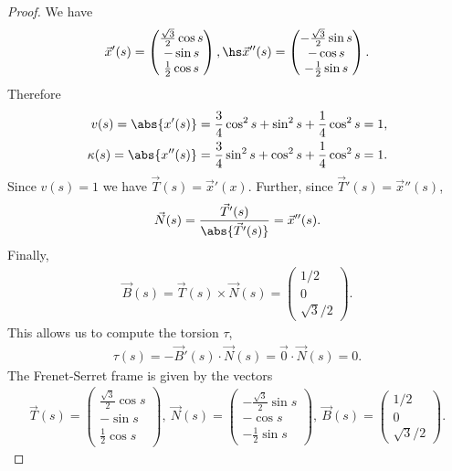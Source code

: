 \documentclass{article}
\begin{document}
\begin{proof}
   We have
   \begin{align*}
      \vec x'(s) = \begin{pmatrix}
         \frac{\sqrt{3}}{2}\cos s\\
         - \sin s\\
         \frac{1}{2}\cos s
      \end{pmatrix},\hs
      \vec x''(s) = \begin{pmatrix}
         -\frac{\sqrt{3}}{2}\sin s\\
         - \cos s\\
         -\frac{1}{2}\sin s
      \end{pmatrix}.
   \end{align*}
   Therefore 
   \begin{align*}
      v(s) = \abs{x'(s)} &= \frac{3}{4}\cos^2 s + \sin^2 s + \frac{1}{4}\cos^2 s = 1,\\
      \kappa(s) = \abs{x''(s)} &= \frac{3}{4}\sin^2 s + \cos^2 s + \frac{1}{4}\cos^2 s = 1.
   \end{align*}
   Since $v(s)=1$ we have $\vec T(s)=\vec x'(x)$. Further, since 
   $\vec T'(s)=\vec x''(s)$,
   \begin{align*}
      \vec N(s) = \frac{\vec T'(s)}{\abs{\vec T'(s)}} = \vec x''(s).
   \end{align*}
   Finally,
   \begin{align*}
      \vec B (s) = \vec T(s) \times \vec N(s) = \begin{pmatrix}
         1/2\\ 0 \\ \sqrt{3}/2
      \end{pmatrix}.
   \end{align*}
   This allows us to compute the torsion $\tau$,
   \begin{align*}
      \tau(s) = -\vec B'(s) \cdot \vec N(s) = \vec 0 \cdot \vec N(s) = 0.
   \end{align*}
   The Frenet-Serret frame is given by the vectors
   \begin{align*}
      \vec T(s) = \begin{pmatrix}
         \frac{\sqrt{3}}{2}\cos s\\
         - \sin s\\
         \frac{1}{2}\cos s
      \end{pmatrix},\: 
      \vec N(s)=\begin{pmatrix}
         -\frac{\sqrt{3}}{2}\sin s\\
         - \cos s\\
         -\frac{1}{2}\sin s
      \end{pmatrix}, \:
      \vec B(s) = \begin{pmatrix}
         1/2\\ 0 \\ \sqrt{3}/2
      \end{pmatrix}.
   \end{align*}
\end{proof}
\end{document}
